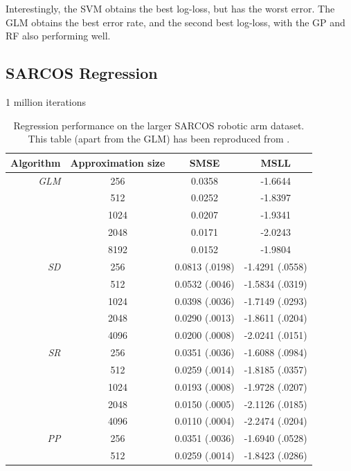 \documentclass[11pt, oneside]{article}
\begin{document}
Interestingly, the SVM obtains the best log-loss, but has the worst error. The
GLM obtains the best error rate, and the second best log-loss, with the GP and
RF also performing well.


\subsection{SARCOS Regression}

1 million iterations

\begin{table}[tb]

    \centering
    \caption{Regression performance on the larger SARCOS robotic arm dataset.
        This table (apart from the GLM) has been reproduced from
        \citet{Rasmussen2006}.}
    \label{tab:sarcos}
    \begin{tabular}{r|c|c c}
        \textbf{Algorithm} & \textbf{Approximation size} & \textbf{SMSE} &
        \textbf{MSLL} \\
        \hline
        \emph{GLM} & 256 & 0.0358 & -1.6644 \\
        & 512 & 0.0252 & -1.8397 \\
        & 1024 & 0.0207 & -1.9341 \\
        & 2048 & 0.0171 & -2.0243 \\
        & 8192 & 0.0152 & -1.9804 \\
        \hline
        \emph{SD} & 256 & 0.0813 (.0198) & -1.4291 (.0558) \\
        & 512 & 0.0532 (.0046) & -1.5834 (.0319) \\
        & 1024 & 0.0398 (.0036) & -1.7149 (.0293) \\
        & 2048 & 0.0290 (.0013) & -1.8611 (.0204) \\
        & 4096 & 0.0200 (.0008) & -2.0241 (.0151)\\
        \hline
        \emph{SR} & 256 & 0.0351 (.0036) & -1.6088 (.0984) \\
        & 512 &  0.0259 (.0014) & -1.8185 (.0357) \\
        & 1024 & 0.0193 (.0008) & -1.9728 (.0207) \\
        & 2048 & 0.0150 (.0005) & -2.1126 (.0185) \\
        & 4096 & 0.0110 (.0004) & -2.2474 (.0204) \\
        \hline
        \emph{PP} & 256 & 0.0351 (.0036) & -1.6940 (.0528) \\
        & 512 & 0.0259 (.0014) & -1.8423 (.0286) \\

\end{tabular}
\end{table}
\end{document}
